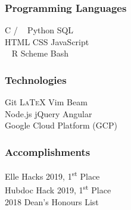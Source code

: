\documentclass{mxresume}
\begin{document}
\begin{resumeheading}
\headingPad
\end{resumeheading}
\vspace{-1mm}
%
\begin{minipage}[t]{0.25\textwidth}
\begin{sidebar}
\\[1mm]
 \\[1mm]
 \\[1mm]
\subsubsection*{Programming Languages}
C / \Cpp\ \Bullet 
Python \Bullet 
SQL \\[1mm]
HTML \Bullet 
CSS \Bullet 
JavaScript \\[1mm]
\Csharp\ \Bullet 
R \Bullet 
Scheme \Bullet 
Bash
%
\subsubsection*{Technologies}
Git \Bullet
\textsc{\LaTeX} \Bullet
Vim \Bullet 
Beam
\\[1mm]
Node.js \Bullet
jQuery \Bullet
Angular\\[1mm]
Google Cloud Platform (GCP)
\subsubsection*{Accomplishments}
Elle Hacks 2019, 1\textsuperscript{st} Place \\[1mm]
Hubdoc Hack 2019, 1\textsuperscript{st} Place \\[1mm]
2018 Dean's Honours List

\end{sidebar}
\end{minipage}
\end{document}
